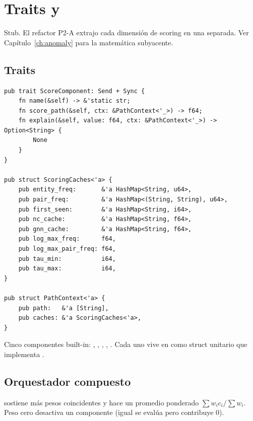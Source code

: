 \chapter{Traits  y }
\label{ch:scorer-traits}

\begin{note}
Stub. El refactor P2-A extrajo cada dimensión de scoring en una
 separada. Ver
Capítulo~\ref{ch:anomaly} para la matemática subyacente.
\end{note}

\section{Traits}

\begin{lstlisting}[style=rust]
pub trait ScoreComponent: Send + Sync {
    fn name(&self) -> &'static str;
    fn score_path(&self, ctx: &PathContext<'_>) -> f64;
    fn explain(&self, value: f64, ctx: &PathContext<'_>) -> Option<String> {
        None
    }
}

pub struct ScoringCaches<'a> {
    pub entity_freq:       &'a HashMap<String, u64>,
    pub pair_freq:         &'a HashMap<(String, String), u64>,
    pub first_seen:        &'a HashMap<String, i64>,
    pub nc_cache:          &'a HashMap<String, f64>,
    pub gnn_cache:         &'a HashMap<String, f64>,
    pub log_max_freq:      f64,
    pub log_max_pair_freq: f64,
    pub tau_min:           i64,
    pub tau_max:           i64,
}

pub struct PathContext<'a> {
    pub path:   &'a [String],
    pub caches: &'a ScoringCaches<'a>,
}
\end{lstlisting}

Cinco componentes built-in: ,
, ,
, . Cada uno vive en
 como
struct unitario que implementa .

\section{Orquestador compuesto}

 sostiene  más pesos coincidentes y hace un promedio
ponderado $\sum w_i c_i / \sum w_i$. Peso cero desactiva un
componente (igual se evalúa pero contribuye 0).

